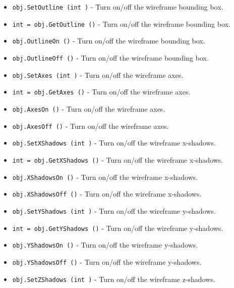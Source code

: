 \begin{itemize}
\item  \verb|obj.SetOutline (int )| -  Turn on/off the wireframe bounding box.

\item  \verb|int = obj.GetOutline ()| -  Turn on/off the wireframe bounding box.

\item  \verb|obj.OutlineOn ()| -  Turn on/off the wireframe bounding box.

\item  \verb|obj.OutlineOff ()| -  Turn on/off the wireframe bounding box.

\item  \verb|obj.SetAxes (int )| -  Turn on/off the wireframe axes.

\item  \verb|int = obj.GetAxes ()| -  Turn on/off the wireframe axes.

\item  \verb|obj.AxesOn ()| -  Turn on/off the wireframe axes.

\item  \verb|obj.AxesOff ()| -  Turn on/off the wireframe axes.

\item  \verb|obj.SetXShadows (int )| -  Turn on/off the wireframe x-shadows.

\item  \verb|int = obj.GetXShadows ()| -  Turn on/off the wireframe x-shadows.

\item  \verb|obj.XShadowsOn ()| -  Turn on/off the wireframe x-shadows.

\item  \verb|obj.XShadowsOff ()| -  Turn on/off the wireframe x-shadows.

\item  \verb|obj.SetYShadows (int )| -  Turn on/off the wireframe y-shadows.

\item  \verb|int = obj.GetYShadows ()| -  Turn on/off the wireframe y-shadows.

\item  \verb|obj.YShadowsOn ()| -  Turn on/off the wireframe y-shadows.

\item  \verb|obj.YShadowsOff ()| -  Turn on/off the wireframe y-shadows.

\item  \verb|obj.SetZShadows (int )| -  Turn on/off the wireframe z-shadows.


\end{itemize}
